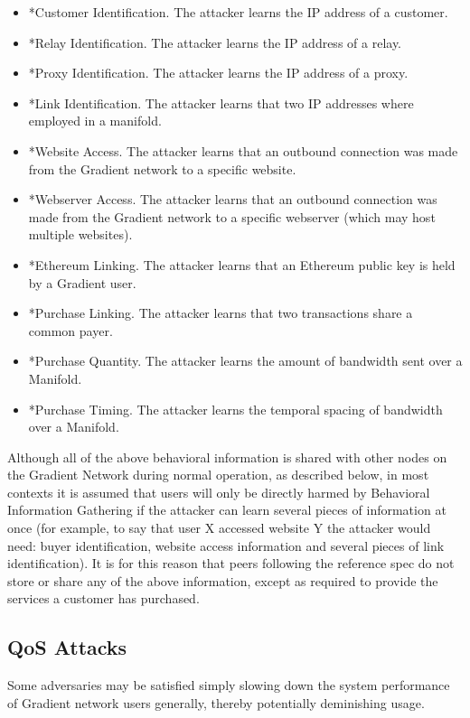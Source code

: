 \documentclass{article}
\begin{document}
\begin{itemize}
    \item *Customer Identification. The attacker learns the IP address of a customer.
    \item *Relay Identification. The attacker learns the IP address of a relay.
    \item *Proxy Identification. The attacker learns the IP address of a proxy.
    \item *Link Identification. The attacker learns that two IP addresses where employed in a manifold.
    \item *Website Access. The attacker learns that an outbound connection was made from the Gradient network to a specific website.
    \item *Webserver Access. The attacker learns that an outbound connection was made from the Gradient network to a specific webserver (which may host multiple websites).
    \item *Ethereum Linking. The attacker learns that an Ethereum public key is held by a Gradient user.
    \item *Purchase Linking. The attacker learns that two transactions share a common payer.
    \item *Purchase Quantity. The attacker learns the amount of bandwidth sent over a Manifold.
    \item *Purchase Timing. The attacker learns the temporal spacing of bandwidth over a Manifold.
\end{itemize}

Although all of the above behavioral information is shared with other nodes on the Gradient Network during normal operation, as described below, in most contexts it is assumed that users will only be directly harmed by Behavioral Information Gathering if the attacker can learn several pieces of information at once (for example, to say that user X accessed website Y the attacker would need: buyer identification, website access information and several pieces of link identification). It is for this reason that peers following the reference spec do not store or share any of the above information, except as required to provide the services a customer has purchased.

\subsection{QoS Attacks}
\label{qos}

Some adversaries may be satisfied simply slowing down the system performance of Gradient network users generally, thereby potentially deminishing usage.
\end{document}
